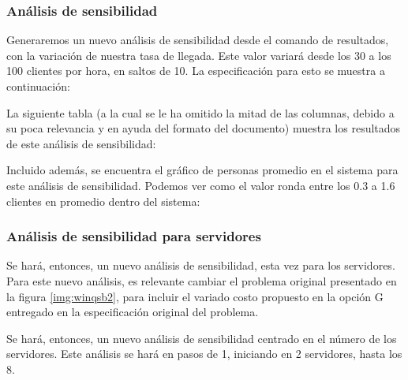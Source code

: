 \subsubsection{Análisis de sensibilidad}
Generaremos un nuevo análisis de sensibilidad desde el comando de resultados, con la variación de nuestra tasa de llegada. Este valor variará desde los 30 a los 100 clientes por hora, en saltos de 10. La especificación para esto se muestra a continuación:


La siguiente tabla (a la cual se le ha omitido la mitad de las columnas, debido a su poca relevancia y en ayuda del formato del documento) muestra los resultados de este análisis de sensibilidad:


Incluido además, se encuentra el gráfico de personas promedio en el sistema para este análisis de sensibilidad. Podemos ver como el valor ronda entre los 0.3 a 1.6 clientes en promedio dentro del sistema:


\subsubsection{Análisis de sensibilidad para servidores}
Se hará, entonces, un nuevo análisis de sensibilidad, esta vez para los servidores. Para este nuevo análisis, es relevante cambiar el problema original presentado en la figura \ref{img:winqsb2}, para incluir el variado costo propuesto en la opción G entregado en la especificación original del problema.


Se hará, entonces, un nuevo análisis de sensibilidad centrado en el número de los servidores. Este análisis se hará en pasos de 1, iniciando en 2 servidores, hasta los 8.


